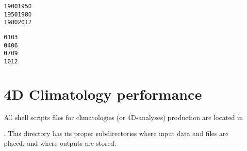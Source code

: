 \begin{center}
\begin{exfile}[H] %
\begin{footnotesize}
\begin{verbatim}
19001950
19501980
19802012
\end{verbatim}
\end{footnotesize}
\caption{}
\label{yearlistexp}
\end{exfile}
\end{center}
 
\begin{center}
\begin{exfile}[H] %
\begin{footnotesize}
\begin{verbatim}
0103
0406
0709
1012
\end{verbatim}
\end{footnotesize}
\caption{}
\label{monthlistexp}
\end{exfile}
\end{center}


\begin{center}
\end{center}

\section{\diva 4D Climatology performance}

All \diva shell scripts files for climatologies (or 4D-analyses) production are located in \par {}. This directory has its proper subdirectories  where input data and files are placed, and  where \diva outputs are stored.


